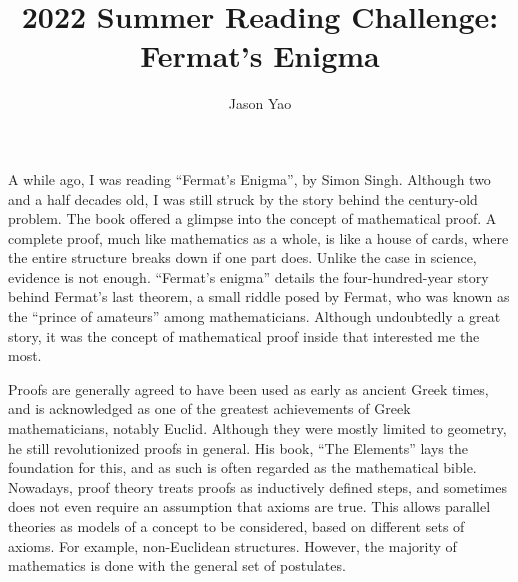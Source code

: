 \documentclass{article}
\title{2022 Summer Reading Challenge: Fermat’s Enigma}
\author{Jason Yao}
\begin{document}
\maketitle
A while ago, I was reading “Fermat’s Enigma”, by Simon Singh. Although two and a half decades old, I was still struck by the story behind the century-old problem. The book offered a glimpse into the concept of mathematical proof. A complete proof, much like mathematics as a whole, is like a house of cards, where the entire structure breaks down if one part does. Unlike the case in science, evidence is not enough. “Fermat’s enigma” details the four-hundred-year story behind Fermat’s last theorem, a small riddle posed by Fermat, who was known as the “prince of amateurs” among mathematicians. Although undoubtedly a great story, it was the concept of mathematical proof inside that interested me the most.

Proofs are generally agreed to have been used as early as ancient Greek times, and is acknowledged as one of the greatest achievements of Greek mathematicians, notably Euclid. Although they were mostly limited to geometry, he still revolutionized proofs in general. His book, “The Elements” lays the foundation for this, and as such is often regarded as the mathematical bible. Nowadays, proof theory treats proofs as inductively defined steps, and sometimes does not even require an assumption that axioms are true. This allows parallel theories as models of a concept to be considered, based on different sets of axioms. For example, non-Euclidean structures. However, the majority of mathematics is done with the general set of postulates.
\end{document}
